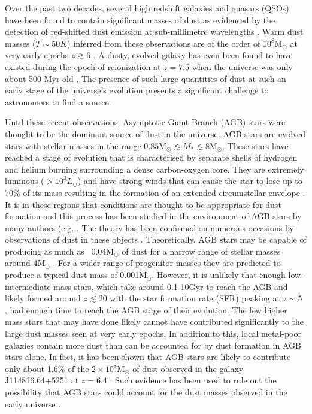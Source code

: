 Over the past two decades, several high redshift galaxies and quasars (QSOs) have been found to contain significant masses of dust as evidenced by the detection of red-shifted dust emission at sub-millimetre wavelengths \citep{Carilli2001, Omont2001, Bertoldi2002, Bertoldi2003, Watson2015}.  Warm dust masses ($T\sim50K$) inferred from these observations are of the order of $10^8$M$_{\odot}$ at very early epochs $z \gtrsim 6$ \citep{Robson2004,Beelen2006,Dwek2007}.  A dusty, evolved galaxy has even been found to have existed during the epoch of reionization at $z=7.5$ when the universe was only about 500 Myr old \citep{Watson2015}.  The presence of such large quantities of dust at such an early stage of the universe's evolution presents a significant challenge to astronomers to find a source.  

Until these recent observations, Asymptotic Giant Branch (AGB) stars were thought to be the dominant source of dust in the universe.  AGB stars are evolved stars with stellar masses in the range $0.85$M$_{\odot} \lesssim M_{*} \lesssim 8$M$_{\odot}$.  These stars have reached a stage of evolution that is characterised by separate shells of hydrogen and helium burning surrounding a dense carbon-oxygen core. They are extremely luminous ($>10^3L_{\odot}$) and have strong winds that can cause the star to lose up to 70\% of its mass resulting in the formation of an extended circumstellar envelope \citep{Wood2004a}.  It is in these regions that conditions are thought to be appropriate for dust formation and this process has been studied in the environment of AGB stars by many authors (e.g. \citet{Gail1999,Cherchneff2000,Ferrarotti2005}.  The theory has been confirmed on numerous occasions by observations of dust  in these objects \citep{Meixner2006,Matsuura2009,Sloan2009,Boyer2011,Boyer2012,Riebel2012,Matsuura2013}. Theoretically, AGB stars may be capable of producing as much as ~0.04M$_{\odot}$ of dust for a narrow range of stellar masses around 4M$_{\odot}$ \citep{Ferrarotti2006}.  For a wider range of progenitor masses they are predicted to produce a typical dust mass of 0.001M$_{\odot}$. However, it is unlikely that enough low-intermediate mass stars, which take around 0.1-10Gyr to reach the AGB \citep{Salaris2014} and likely formed around $z\lesssim20$ with the star formation rate (SFR) peaking at $z\sim5$ \citep{Greif2006}, had enough time to reach the AGB stage of their evolution.  The few higher mass stars that may have done likely cannot have contributed significantly to the large dust masses seen at very early epochs.  In addition to this, local metal-poor galaxies contain more dust than can be accounted for by dust formation in AGB stars alone.  In fact, it has been shown that AGB stars are likely to contribute only about 1.6\% of the $2\times 10^8$M$_{\odot}$ of dust observed in the galaxy J114816.64+5251 at $z=6.4$ \citep{Dwek2007,Matsuura2009,Matsuura2013}.  Such evidence has been used to rule out the possibility that AGB stars could account for the dust masses observed in the early universe \citep{Michalowski2015}.

